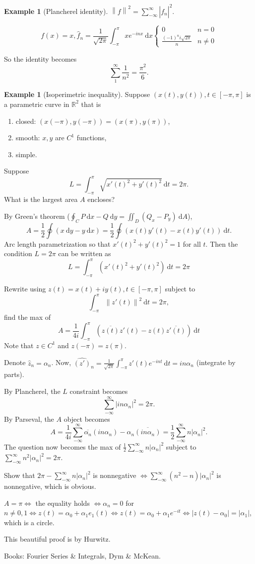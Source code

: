 \documentclass{report}
\newcommand{\R}{\mathbb{R}}
\newcommand{\df}{\ \mathrm{d}}
\newcommand{\norm}[1]{\left\| #1 \right\|}
\theoremstyle{definition}
\newtheorem{example}[theorem]{Example}
\theoremstyle{remark}
\begin{document}
\begin{example}
	[Plancherel identity] $\norm{f}^2 = \sum_{-\infty}^\infty |\hat{f_n}|^2$.
	
	\[f(x) = x, \hat{f}_n = \frac{1}{\sqrt{2\pi}}\int_{-\pi}^\pi xe^{-inx} \df x\begin{cases}
		0 & n = 0 \\
		\frac{(-1)^ni\sqrt{2\pi}}{n} & n \neq 0
	\end{cases}\]

	So the identity becomes \[
		\sum_{1}^\infty \frac{1}{n^2} = \frac{\pi^2}{6}.	
	\]
\end{example}
\begin{example}[Isoperimetric inequality]
	Suppose $(x(t), y(t)), t \in [-\pi, \pi]$ is a parametric curve in $\R^2$ that is \begin{enumerate}
		\item closed: $(x(-\pi), y(-\pi)) = (x(\pi), y(\pi))$,
		\item smooth: $x, y$ are $C^1$ functions,
		\item simple.
	\end{enumerate}
	Suppose \[
		L = \int_{-\pi}^\pi\sqrt{x'(t)^2 + y'(t)^2} \df t = 2\pi.	
	\]
	What is the largest area $A$ encloses?

	By Green's theorem ($\oint_C P \df x - Q \df y = \iint_D (Q_x - P_y) \df A$), \[
		A = \frac{1}{2} \oint (x\df y - y \df x) = \frac{1}{2}\oint (x(t)y'(t) - x(t)y'(t)) \df t.
	\] 
	Arc length parametrization so that $x'(t)^2 + y'(t)^2 = 1$ for all $t$. Then the condition $L = 2\pi$ can be written as \[
		L = \int_{-\pi}^\pi \left(x'(t)^2 + y'(t)^2\right) \df t = 2\pi
	\]

	Rewrite using $z(t) = x(t) + iy(t), t \in [-\pi, \pi]$ subject to \[
		\int_{-\pi}^\pi \norm{z'(t)}^2 \df t = 2\pi,
	\] find the max of \[
		A = \frac{1}{4i}\int_{-\pi}^\pi \left(\overline{z(t)}z'(t) - z(t)\overline{z'(t)} \right)\df t	
	\]
	Note that $z \in C^1$ and $z(-\pi) = z(\pi)$.

	Denote $\hat{z}_n = \alpha_n$. Now, $\widehat{(z')}_n = \frac{1}{\sqrt{2\pi}}\int_{-\pi}^\pi z'(t)e^{-int} \df t = in\alpha_n$ (integrate by parts).

	By Plancherel, the $L$ constraint becomes \[
		\sum_{-\infty}^\infty |in\alpha_n|^2 = 2\pi.
	\]
	By Parseval, the $A$ object becomes \[
		A = \frac{1}{4i}\sum_{-\infty}^\infty \overline{\alpha_n}(in\alpha_n) - \alpha_n\overline{(in\alpha_n)} = \frac{1}{2}\sum_{-\infty}^\infty n|\alpha_n|^2.
	\]
	The question now becomes the max of $\displaystyle \frac{1}{2}\sum_{-\infty}^\infty n|\alpha_n|^2$ subject to $\displaystyle \sum_{-\infty}^\infty n^2|\alpha_n|^2 = 2\pi$.

	Show that $2\pi - \displaystyle \sum_{-\infty}^\infty n|\alpha_n|^2$ is nonnegative $\iff \displaystyle \sum_{-\infty}^\infty (n^2 - n)|\alpha_n|^2$ is nonnegative, which is obvious. 
	
	$A = \pi \iff$ the equality holds $\iff \alpha_n = 0$ for $n \neq 0, 1 \iff z(t) = \alpha_0 + \alpha_1e_1(t) \iff z(t) = \alpha_0 + \alpha_1e^{-it} \iff |z(t) - \alpha_0| = |\alpha_1|$, which is a circle.

	This beautiful proof is by Hurwitz.
\end{example}

Books: Fourier Series \& Integrals, Dym \& McKean.




\end{document}
